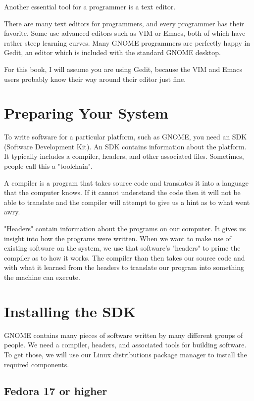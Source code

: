 Another essential tool for a programmer is a text editor.

There are many text editors for programmers, and every programmer has their
favorite. Some use advanced editors such as VIM or Emacs, both of which have
rather steep learning curves. Many GNOME programmers are perfectly happy in 
Gedit, an editor which is included with the standard GNOME desktop. 

For this book, I will assume you are using Gedit, because the VIM and Emacs
users probably know their way around their editor just fine.

\section{Preparing Your System}

To write software for a particular platform, such as GNOME, you need an SDK
(Software Development Kit). An SDK contains information about the platform. It
typically includes a compiler, headers, and other associated files. Sometimes,
people call this a "toolchain".

A compiler is a program that takes source code and translates it into a
language that the computer knows. If it cannot understand the code then it will
not be able to translate and the compiler will attempt to give us a hint as to
what went awry.

"Headers" contain information about the programs on our computer.  It gives us
insight into how the programs were written. When we want to make use of
existing software on the system, we use that software's "headers" to prime the
compiler as to how it works. The compiler than then takes our source code and
with what it learned from the headers to translate our program into something
the machine can execute.


\section{Installing the SDK}

GNOME contains many pieces of software written by many different groups of
people. We need a compiler, headers, and associated tools for building
software. To get those, we will use our Linux distributions package manager to
install the required components.


\subsection{Fedora 17 or higher}

